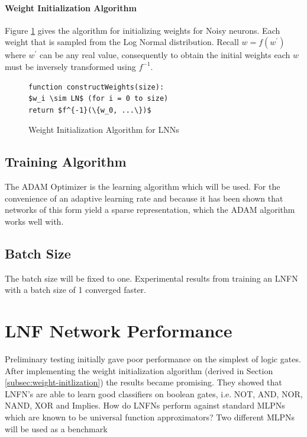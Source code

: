 \noindent
\begin{minipage}[t]{0.48\textwidth}
\vspace{0px}
\paragraph{Weight Initialization Algorithm}
Figure \ref{alg:lnn-initlization} gives the algorithm for initializing weights for Noisy neurons. Each weight that is sampled from the Log Normal distribution. Recall $w = f(w^{'})$ where $w^{'}$ can be any real value, consequently to obtain the initial weights each $w$ must be inversely transformed using $f^{-1}$.
\end{minipage}
\hspace{0.05\textwidth}
\begin{minipage}[t]{0.47\textwidth}
\vspace{0px}
\begin{figure}[H]
	\begin{lstlisting}[mathescape=true]
function constructWeights(size):
$w_i \sim LN$ (for i = 0 to size)
return $f^{-1}(\{w_0, ...\})$
\end{lstlisting}
	\caption{Weight Initialization Algorithm for LNNs}
	\label{alg:lnn-initlization}
\end{figure}
\end{minipage}

\subsection{Training Algorithm}
The ADAM Optimizer \cite{kingma2014adam} is the learning algorithm which will be used. For the convenience of an adaptive learning rate and because it has been shown that networks of this form yield a sparse representation, which the ADAM algorithm works well with.

\subsection{Batch Size}
The batch size will be fixed to one. Experimental results from training an LNFN with a batch size of 1 converged faster. 

\section{LNF Network Performance}
Preliminary testing initially gave poor performance on the simplest of logic gates. After implementing the weight initialization algorithm (derived in Section \ref{subsec:weight-initlization}) the results became promising. They showed that LNFN's are able to learn good classifiers on boolean gates, i.e. NOT, AND, NOR, NAND, XOR and Implies. How do LNFNs perform against standard MLPNs which are known to be universal function approximators? Two different MLPNs will be used as a benchmark


